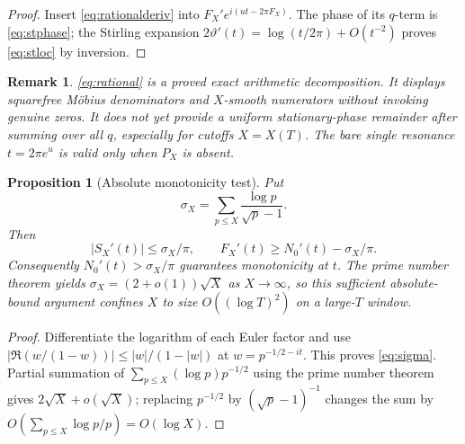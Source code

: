 \documentclass[11pt,a4paper]{article}
\numberwithin{equation}{section}
\newtheorem{proposition}[theorem]{Proposition}
\newtheorem{remark}[theorem]{Remark}
\begin{document}
\begin{proof}
Insert \eqref{eq:rationalderiv} into $F_X'e^{i(ut-2\pi F_X)}$. The phase of its $q$-term is \eqref{eq:stphase}; the Stirling expansion $2\vartheta'(t)=\log(t/2\pi)+O(t^{-2})$ proves \eqref{eq:stloc} by inversion.
\end{proof}
\begin{remark}
\eqref{eq:rational} is a \emph{proved exact arithmetic decomposition}. It displays squarefree M\"obius denominators and $X$-smooth numerators without invoking genuine zeros. It does \emph{not} yet provide a uniform stationary-phase remainder after summing over all $q$, especially for cutoffs $X=X(T)$. The bare single resonance $t=2\pi e^u$ is valid only when $P_X$ is absent.
\end{remark}
\begin{proposition}[Absolute monotonicity test]\label{prop:cutoff}
Put
\[\sigma_X=\sum_{p\le X}\frac{\log p}{\sqrt p-1}.\]
Then
\begin{equation}\label{eq:sigma}
|S_X'(t)|\le\sigma_X/\pi,\qquad
F_X'(t)\ge N_0'(t)-\sigma_X/\pi.
\end{equation}
Consequently $N_0'(t)>\sigma_X/\pi$ guarantees monotonicity at $t$. The prime number theorem yields $\sigma_X=(2+o(1))\sqrt X$ as $X\to\infty$, so this \emph{sufficient absolute-bound argument} confines $X$ to size $O((\log T)^2)$ on a large-$T$ window.
\end{proposition}
\begin{proof}
Differentiate the logarithm of each Euler factor and use $|\Re(w/(1-w))|\le|w|/(1-|w|)$ at $w=p^{-1/2-it}$. This proves \eqref{eq:sigma}. Partial summation of $\sum_{p\le X}(\log p)p^{-1/2}$ using the prime number theorem gives $2\sqrt X+o(\sqrt X)$; replacing $p^{-1/2}$ by $(\sqrt p-1)^{-1}$ changes the sum by $O(\sum_{p\le X}\log p/p)=O(\log X)$.
\end{proof}
\end{document}
